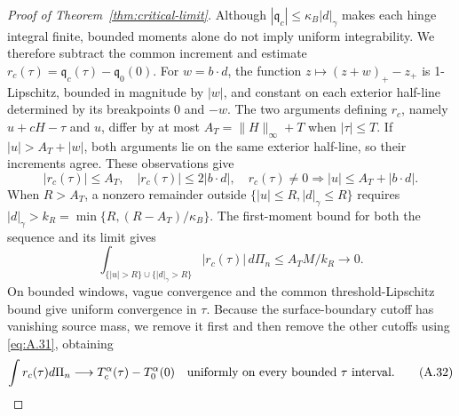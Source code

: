 \begin{proof}[Proof of Theorem~\ref{thm:critical-limit}]
Although \(|\mathfrak q_c|\le\kappa_B|d|_\gamma\) makes each hinge integral finite, bounded moments alone do not imply uniform integrability. We therefore subtract the common increment and estimate \(r_c(\tau)=\mathfrak q_c(\tau)-\mathfrak q_0(0)\). For \(w=b\cdot d\), the function \(z\mapsto(z+w)_+-z_+\) is 1-Lipschitz, bounded in magnitude by \(|w|\), and constant on each exterior half-line determined by its breakpoints \(0\) and \(-w\). The two arguments defining \(r_c\), namely \(u+cH-\tau\) and \(u\), differ by at most \(A_T=\|H\|_\infty+T\) when \(|\tau|\le T\). If \(|u|>A_T+|w|\), both arguments lie on the same exterior half-line, so their increments agree. These observations give
\begin{equation}
|r_c(\tau)|\le A_T,\quad |r_c(\tau)|\le2|b\cdot d|,
\quad r_c(\tau)\ne0\Longrightarrow |u|\le A_T+|b\cdot d|.
\tag{A.30}\label{eq:A.30}
\end{equation}
When \(R>A_T\), a nonzero remainder outside \(\{|u|\le R,|d|_\gamma\le R\}\) requires \(|d|_\gamma>k_R=\min\{R,(R-A_T)/\kappa_B\}\). The first-moment bound for both the sequence and its limit gives
\begin{equation}
\int_{\{|u|>R\}\cup\{|d|_\gamma>R\}}|r_c(\tau)|\,d\Pi_n
\le A_TM/k_R\longrightarrow0.
\tag{A.31}\label{eq:A.31}
\end{equation}
On bounded windows, vague convergence and the common threshold-Lipschitz bound give uniform convergence in \(\tau\). Because the surface-boundary cutoff has vanishing source mass, we remove it first and then remove the other cutoffs using \eqref{eq:A.31}, obtaining
\begin{equation}
\int r_c(\tau)d\Pi_n\longrightarrow
T_c^\alpha(\tau)-T_0^\alpha(0)
\quad\hbox{uniformly on every bounded }\tau\hbox{ interval.}
\tag{A.32}\label{eq:A.32}
\end{equation}


\end{proof}
